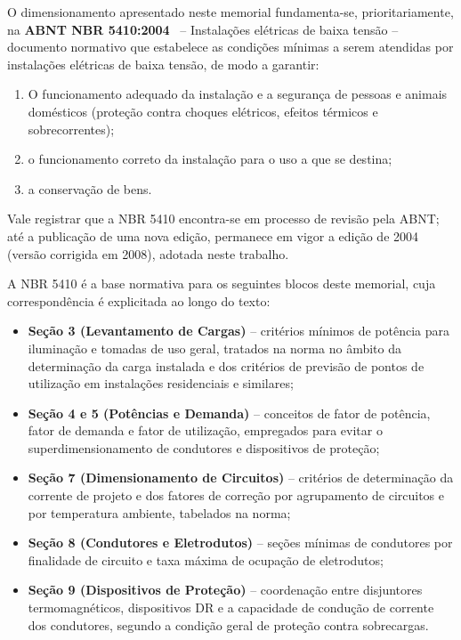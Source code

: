 \documentclass[12pt,openright,oneside,a4paper,brazil]{abntex2}
\newcommand{\norma}[1]{\textbf{#1}}
\begin{document}
\hspace{1.27cm}O dimensionamento apresentado neste memorial fundamenta-se, prioritariamente,
na \norma{ABNT NBR 5410:2004}~\cite{nbr5410} -- {Instalações elétricas de baixa
tensão} -- documento normativo que estabelece as condições mínimas a serem
atendidas por instalações elétricas de baixa tensão, de modo a garantir:

\begin{enumerate}[leftmargin=1.2cm]
    \item O funcionamento adequado da instalação e a segurança de pessoas e
    animais domésticos (proteção contra choques elétricos, efeitos térmicos
    e sobrecorrentes);
    \item o funcionamento correto da instalação para o uso a que se destina;
    \item a conservação de bens.
\end{enumerate}

Vale registrar que a NBR 5410 encontra-se em processo de revisão pela ABNT; até a publicação de uma nova edição, permanece em vigor a edição de 2004 (versão corrigida em 2008), adotada neste trabalho.

A NBR 5410 é a base normativa para os seguintes blocos deste memorial, cuja
correspondência é explicitada ao longo do texto:

\begin{itemize}[leftmargin=1.2cm]
    \item \textbf{Seção 3 (Levantamento de Cargas)} -- critérios mínimos de
    potência para iluminação e tomadas de uso geral, tratados na norma no
    âmbito da determinação da {carga instalada} e dos {critérios
    de previsão de pontos de utilização} em instalações residenciais e
    similares;
    \item \textbf{Seção 4 e 5 (Potências e Demanda)} -- conceitos de
    {fator de potência}, {fator de demanda} e {fator de
    utilização}, empregados para evitar o superdimensionamento de
    condutores e dispositivos de proteção;
    \item \textbf{Seção 7 (Dimensionamento de Circuitos)} -- critérios de
    determinação da corrente de projeto e dos fatores de correção por
    agrupamento de circuitos e por temperatura ambiente, tabelados na norma;
    \item \textbf{Seção 8 (Condutores e Eletrodutos)} -- seções mínimas de
    condutores por finalidade de circuito e taxa máxima de ocupação de
    eletrodutos;
    \item \textbf{Seção 9 (Dispositivos de Proteção)} -- coordenação entre
    disjuntores termomagnéticos, dispositivos DR e a capacidade de condução
    de corrente dos condutores, segundo a condição geral de proteção contra
    sobrecargas.
\end{itemize}
\end{document}
